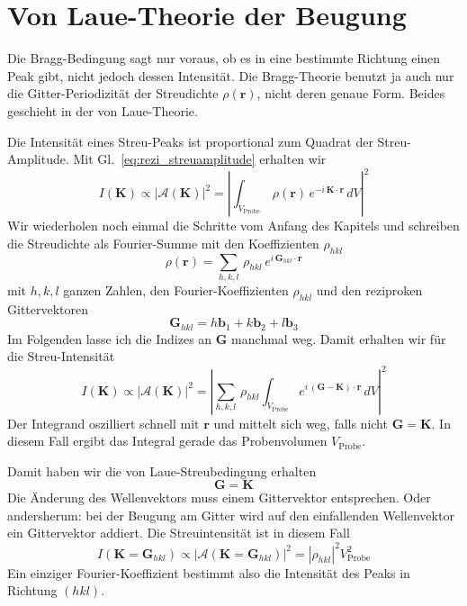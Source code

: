  
\section{Von Laue-Theorie der Beugung} 
 
Die Bragg-Bedingung sagt nur voraus, ob es in eine bestimmte Richtung einen Peak gibt, nicht jedoch dessen Intensität. Die Bragg-Theorie benutzt ja auch nur die Gitter-Periodizität der Streudichte $\rho( \mathbf{r})$, nicht deren genaue Form. Beides geschieht in der von Laue-Theorie.

Die Intensität eines Streu-Peaks ist proportional zum Quadrat der Streu-Amplitude. Mit Gl.~\ref{eq:rezi_streuamplitude} erhalten wir
\begin{equation}
I(\mathbf{K}) \propto \left| \mathcal{A}(\mathbf{K}) \right|^2 
= \left|   \int_{V_\text{Probe}} \, \rho( \mathbf{r}) \,   e^{- i \,   \mathbf{K} \cdot \mathbf{r}} \, dV \right|^2
\end{equation}
Wir wiederholen noch einmal die Schritte vom Anfang des Kapitels und schreiben die Streudichte als Fourier-Summe mit den Koeffizienten $\rho_{hkl}$
\begin{equation}
  \rho(\mathbf{r}) = \sum_{h,k,l} \, \rho_{hkl} \, e^{i \, \mathbf{G}_{hkl} \cdot \mathbf{r}}
\end{equation}
mit $h,k,l$ ganzen Zahlen, den Fourier-Koeffizienten $\rho_{hkl}$ und den  reziproken Gittervektoren
\begin{equation}
\mathbf{G}_{hkl} = h \mathbf{b}_1 + k \mathbf{b}_2 + l \mathbf{b}_3 
\end{equation}
Im Folgenden lasse ich die Indizes an $\mathbf{G}$ manchmal weg. Damit erhalten wir für die Streu-Intensität 
\begin{equation}
I(\mathbf{K}) \propto \left| \mathcal{A}(\mathbf{K}) \right|^2 
= \left| 
 \sum_{h,k,l} \, \rho_{hkl}
  \int_{V_\text{Probe}}   e^{ i \,   (\mathbf{G}- \mathbf{K} )\cdot \mathbf{r}} \, dV \right|^2
\end{equation}
Der Integrand oszilliert schnell mit $\mathbf{r}$ und mittelt sich weg, falls nicht $\mathbf{G} =  \mathbf{K}$. In diesem Fall ergibt das Integral gerade das Probenvolumen $V_\text{Probe}$.

Damit haben wir die von Laue-Streubedingung erhalten
\begin{equation}
\mathbf{G} =  \mathbf{K}
\end{equation}
Die Änderung des Wellenvektors muss einem Gittervektor entsprechen. Oder andersherum: bei der Beugung am Gitter wird auf den einfallenden Wellenvektor ein Gittervektor addiert.  Die Streuintensität ist in diesem Fall
\begin{equation}
I(\mathbf{K} = \mathbf{G}_{hkl} ) \propto \left| \mathcal{A}(\mathbf{K} = \mathbf{G}_{hkl} ) \right|^2 
= \left| \rho_{hkl} \right|^2   V_\text{Probe}^2 \label{eq:rezi_laue_peak}
\end{equation}
Ein einziger Fourier-Koeffizient bestimmt also die Intensität des Peaks in Richtung $(hkl)$.


